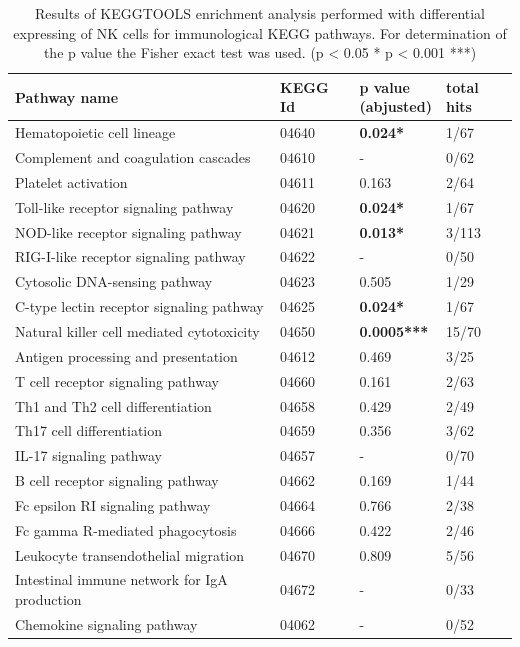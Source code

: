 \documentclass[11pt,a4paper]{article}
\begin{document}
\begin{table}
    \begin{tabular}{ | l | l | l | l |}
    \hline
    \rowcolor{Gainsboro!60}

    Pathway name & KEGG Id & \makecell{p value \\ (abjusted)} & total hits  \\ \hline

    Hematopoietic cell lineage & 04640 & \textbf{0.024*} & 1/67 \\ \hline
    Complement and coagulation cascades & 04610 & - & 0/62 \\ \hline
    Platelet activation & 04611 & 0.163 & 2/64 \\ \hline
    Toll-like receptor signaling pathway & 04620 & \textbf{0.024*} & 1/67 \\ \hline
    NOD-like receptor signaling pathway & 04621 & \textbf{0.013*} & 3/113 \\ \hline

    RIG-I-like receptor signaling pathway & 04622 & - & 0/50 \\ \hline
    Cytosolic DNA-sensing pathway & 04623 & 0.505 & 1/29 \\ \hline
    C-type lectin receptor signaling pathway & 04625 & \textbf{0.024*} & 1/67 \\ \hline
    Natural killer cell mediated cytotoxicity & 04650 & \textbf{0.0005***} & 15/70 \\ \hline
    Antigen processing and presentation & 04612 & 0.469 & 3/25 \\ \hline
    T cell receptor signaling pathway & 04660 & 0.161 & 2/63 \\ \hline
    Th1 and Th2 cell differentiation & 04658 & 0.429 & 2/49 \\ \hline
    Th17 cell differentiation & 04659 & 0.356 & 3/62 \\ \hline
    IL-17 signaling pathway & 04657 & - & 0/70 \\ \hline
    B cell receptor signaling pathway & 04662 & 0.169 & 1/44 \\ \hline
    Fc epsilon RI signaling pathway & 04664 & 0.766 & 2/38 \\ \hline
    Fc gamma R-mediated phagocytosis & 04666 & 0.422 & 2/46 \\ \hline
    Leukocyte transendothelial migration & 04670 & 0.809 & 5/56 \\ \hline
    Intestinal immune network for IgA production & 04672 & - & 0/33  \\ \hline
    Chemokine signaling pathway & 04062 & - & 0/52 \\ \hline

    \end{tabular}

    \caption{Results of KEGGTOOLS enrichment analysis performed with differential expressing of NK
    cells for immunological KEGG pathways. For determination of the p value the Fisher exact test was used. (p < 0.05 * p < 0.001 ***)}
\end{table}
\end{document}
